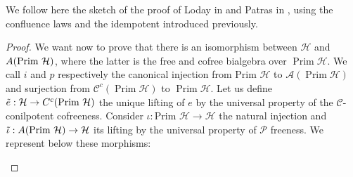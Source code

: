 \documentclass[11pt,leqno]{amsart}
\theoremstyle{definition}
\theoremstyle{plain}
\DeclareMathOperator{\prim}{Prim}
\newcommand{\Hc}{ \mathcal{H} }
\newcommand{\A}{ \mathcal{A} }
\newcommand{\C}{ \mathcal{C} }
\begin{document}
We follow here the sketch of the proof of Loday in \cite{GBO} and Patras in \cite{Patras}, using the confluence laws and the idempotent introduced previously. 
\begin{proof} 
We want now to prove that there is an isomorphism between $\mathcal H$ and $\mathcal \A(\mbox{Prim\ }\mathcal H)$, where the latter is the free and cofree bialgebra over $\prim \Hc$. We call $i$ and $p$ respectively the canonical injection from $\mbox{Prim\ }\mathcal{H}$ to $\A(\prim \Hc)$ and surjection from $\C^c(\prim \Hc)$ to $\prim \Hc$.
Let us define $\tilde e:\mathcal H\to  \mathcal \C^c(\mbox{Prim\ }\mathcal H)$ the unique lifting of $e$ by the universal property of the $\C$-conilpotent cofreeness. Consider $\iota:\mbox{Prim\ }\mathcal H\to \mathcal H$ the natural injection and $\tilde\iota:\mathcal \A(\mbox{Prim\ }\mathcal H)\to\mathcal H$ its lifting by the universal property of $\mathcal P$ freeness. We represent below these morphisms:
\begin{center}

\end{center}
\vspace{-1.2cm}


\end{proof}
\end{document}
